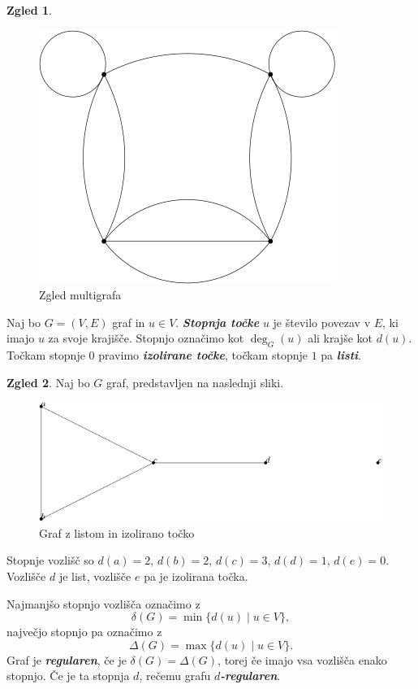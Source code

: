 \documentclass[11pt]{book}
\def\definicija{\color{rdeca}\bf\em}
\theoremstyle{definition}
\theoremstyle{zgled}
\newtheorem*{zgled}{Zgled}
\theoremstyle{odprtproblem}
\theoremstyle{domacanaloga}
\theoremstyle{izrek}
\begin{document}
\begin{zgled}
    \begin{figure}[h]
        \centering
        \includegraphics[width=0.5\linewidth]{img/grafi-multigraf.png}
        \caption{Zgled multigrafa}
    \end{figure}
\end{zgled}

Naj bo $G = (V,E)$ graf in $u \in V$. {\definicija Stopnja točke} $u$ je število povezav v $E$, ki imajo $u$ za svoje krajišče. Stopnjo označimo kot $\deg_G(u)$ ali krajše kot $d(u)$. Točkam stopnje $0$ pravimo {\definicija izolirane točke}, točkam stopnje $1$ pa {\definicija listi}.

\begin{zgled}
Naj bo $G$ graf, predstavljen na naslednji sliki.

\begin{figure}[h]
    \centering
    \includegraphics[width=0.75\linewidth]{img/grafi-std-izolirana.png}
    \caption{Graf z listom in izolirano točko}
\end{figure}

Stopnje vozlišč so $d(a) = 2$, $d(b) = 2$, $d(c) = 3$, $d(d) = 1$, $d(e) = 0$. Vozlišče $d$ je list, vozlišče $e$ pa je izolirana točka.
\end{zgled}

Najmanjšo stopnjo vozlišča označimo z
\[
    \delta(G) = \min \{ d(u) \mid u \in V \},
\]
največjo stopnjo pa označimo z 
\[
  \Delta(G) = \max \{ d(u) \mid u \in V \}. 
\]
Graf je {\definicija regularen}, če je $\delta(G) = \Delta(G)$, torej če imajo vsa vozlišča enako stopnjo. Če je ta stopnja $d$, rečemu grafu {\definicija $d$-regularen}.
\end{document}
